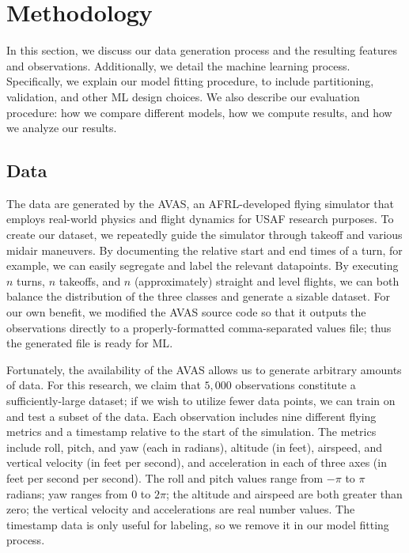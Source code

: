 \documentclass[11pt]{article}
\begin{document}
\section{Methodology}


In this section, we discuss our data generation process and the resulting features and observations. Additionally, we detail the machine learning process. Specifically, we explain our model fitting procedure, to include partitioning, validation, and other \ac{ML} design choices. We also describe our evaluation procedure: how we compare different models, how we compute results, and how we analyze our results.

\subsection{Data}


The data are generated by the \ac{AVAS}, an \ac{AFRL}-developed flying simulator that employs real-world physics and flight dynamics for \ac{USAF} research purposes. To create our dataset, we repeatedly guide the simulator through takeoff and various midair maneuvers. By documenting the relative start and end times of a turn, for example, we can easily segregate and label the relevant datapoints. By executing $n$ turns, $n$ takeoffs, and $n$ (approximately) straight and level flights, we can both balance the distribution of the three classes and generate a sizable dataset. For our own benefit, we modified the \ac{AVAS} source code so that it outputs the observations directly to a properly-formatted comma-separated values file; thus the generated file is ready for \ac{ML}.


Fortunately, the availability of the \ac{AVAS} allows us to generate arbitrary amounts of data. For this research, we claim that $5,000$ observations constitute a sufficiently-large dataset; if we wish to utilize fewer data points, we can train on and test a subset of the data. Each observation includes nine different flying metrics and a timestamp relative to the start of the simulation. The metrics include roll, pitch, and yaw (each in radians), altitude (in feet), airspeed, and vertical velocity (in feet per second), and acceleration in each of three axes (in feet per second per second). The roll and pitch values range from $-\pi$ to $\pi$ radians; yaw ranges from $0$ to $2\pi$; the altitude and airspeed are both greater than zero; the vertical velocity and accelerations are real number values. The timestamp data is only useful for labeling, so we remove it in our model fitting process.
\end{document}
